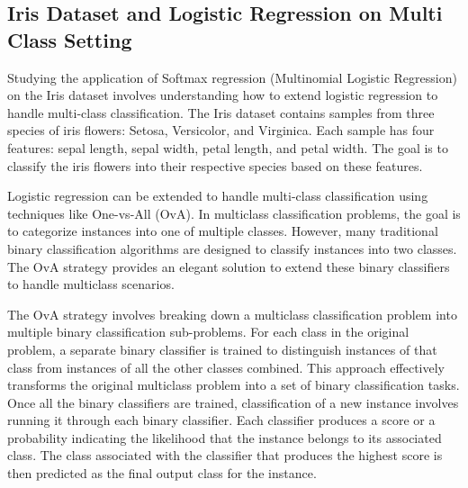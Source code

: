 \documentclass[12pt, a4paper, twoside]{article}
\begin{document}
\subsection{Iris Dataset and Logistic Regression on Multi Class Setting}
Studying the application of Softmax regression (Multinomial Logistic Regression) on the Iris dataset involves understanding how to extend logistic regression to handle multi-class classification. The Iris dataset contains samples from three species of iris flowers: Setosa, Versicolor, and Virginica. Each sample has four features: sepal length, sepal width, petal length, and petal width. The goal is to classify the iris flowers into their respective species based on these features.
\par
Logistic regression can be extended to handle multi-class classification using techniques like One-vs-All (OvA)\cite{ova}.  In multiclass classification problems, the goal is to categorize instances into one of multiple classes. However, many traditional binary classification algorithms are designed to classify instances into two classes. The OvA strategy provides an elegant solution to extend these binary classifiers to handle multiclass scenarios.
\par
The OvA strategy involves breaking down a multiclass classification problem into multiple binary classification sub-problems. For each class in the original problem, a separate binary classifier is trained to distinguish instances of that class from instances of all the other classes combined. This approach effectively transforms the original multiclass problem into a set of binary classification tasks. Once all the binary classifiers are trained, classification of a new instance involves running it through each binary classifier. Each classifier produces a score or a probability indicating the likelihood that the instance belongs to its associated class. The class associated with the classifier that produces the highest score is then predicted as the final output class for the instance.
\end{document}
